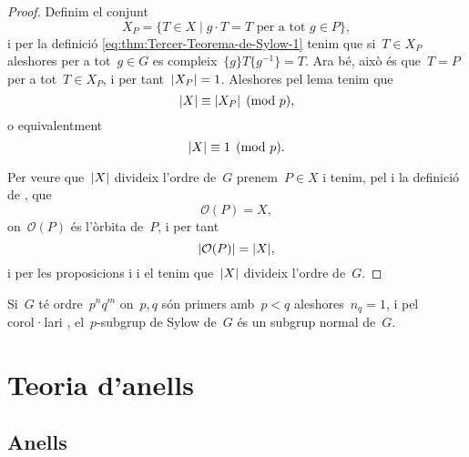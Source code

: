 \documentclass[../../main.tex]{subfiles}
\begin{document}
\begin{proof}
        Definim el conjunt
        \[
            X_{P}=\{T\in X\mid g\cdot T=T\text{ per a tot }g\in P\},
        \]
        i per la definició \eqref{eq:thm:Tercer-Teorema-de-Sylow-1} tenim que si~\(T\in X_{P}\) aleshores per a tot~\(g\in G\) es compleix~\(\{g\}T\{g^{-1}\}=T\).
        Ara bé, això és que~\(T=P\) per a tot~\(T\in X_{P}\), i per tant~\(\abs{X_{P}}=1\).
        Aleshores pel lema  tenim que
        \[
            \abs{X}\equiv\abs{X_{P}}\pmod{p},
        \]
        o equivalentment
        \[
            \abs{X}\equiv1\pmod{p}.
        \]

        Per veure que~\(\abs{X}\) divideix l'ordre de~\(G\) prenem~\(P\in X\) i tenim, pel  i la definició de , que
        \[
            \mathcal{O}(P)=X,
        \]
        on~\(\mathcal{O}(P)\) és l'òrbita de~\(P\), i per tant
        \[
            \abs{\mathcal{O}(P)}=\abs{X},
        \]
        i per les proposicions  i  i el  tenim que~\(\abs{X}\) divideix l'ordre de~\(G\).
    \end{proof}
    \begin{corollary}
        Si~\(G\) té ordre~\(p^{n}q^{m}\) on~\(p,q\) són primers amb~\(p<q\) aleshores~\(n_{q}=1\), i pel corol·lari , el~\(p\)-subgrup de Sylow de~\(G\) és un subgrup normal de~\(G\).
    \end{corollary}
\chapter{Teoria d'anells}
\section{Anells}
\end{document}
